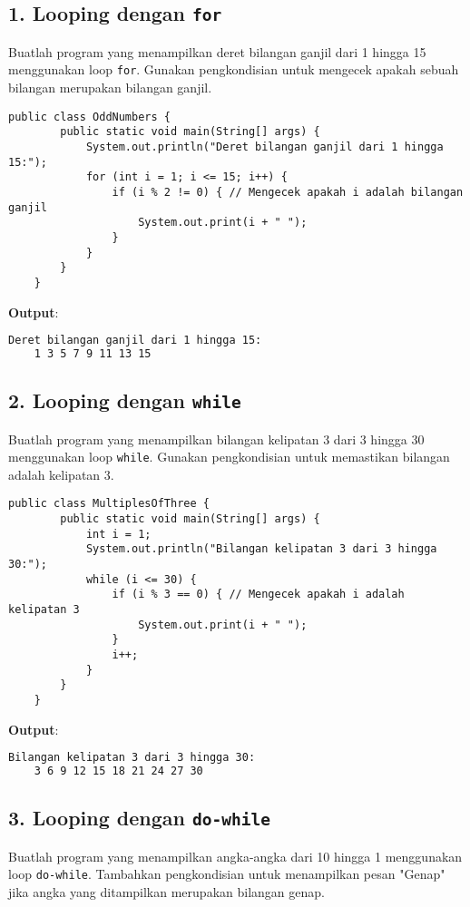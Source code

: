 \subsection{1. Looping dengan \texttt{for}}
Buatlah program yang menampilkan deret bilangan ganjil dari 1 hingga 15 menggunakan loop \texttt{for}. Gunakan pengkondisian untuk mengecek apakah sebuah bilangan merupakan bilangan ganjil.

\begin{lstlisting}[style=JavaStyle]
	public class OddNumbers {
		public static void main(String[] args) {
			System.out.println("Deret bilangan ganjil dari 1 hingga 15:");
			for (int i = 1; i <= 15; i++) {
				if (i % 2 != 0) { // Mengecek apakah i adalah bilangan ganjil
					System.out.print(i + " ");
				}
			}
		}
	}
\end{lstlisting}

\textbf{Output}:
\begin{lstlisting}[language=bash]
	Deret bilangan ganjil dari 1 hingga 15:
	1 3 5 7 9 11 13 15
\end{lstlisting}

\subsection{2. Looping dengan \texttt{while}}
Buatlah program yang menampilkan bilangan kelipatan 3 dari 3 hingga 30 menggunakan loop \texttt{while}. Gunakan pengkondisian untuk memastikan bilangan adalah kelipatan 3.

\begin{lstlisting}[style=JavaStyle]
	public class MultiplesOfThree {
		public static void main(String[] args) {
			int i = 1;
			System.out.println("Bilangan kelipatan 3 dari 3 hingga 30:");
			while (i <= 30) {
				if (i % 3 == 0) { // Mengecek apakah i adalah kelipatan 3
					System.out.print(i + " ");
				}
				i++;
			}
		}
	}
\end{lstlisting}

\textbf{Output}:
\begin{lstlisting}[language=bash]
	Bilangan kelipatan 3 dari 3 hingga 30:
	3 6 9 12 15 18 21 24 27 30
\end{lstlisting}

\subsection{3. Looping dengan \texttt{do-while}}
Buatlah program yang menampilkan angka-angka dari 10 hingga 1 menggunakan loop \texttt{do-while}. Tambahkan pengkondisian untuk menampilkan pesan "Genap" jika angka yang ditampilkan merupakan bilangan genap.

